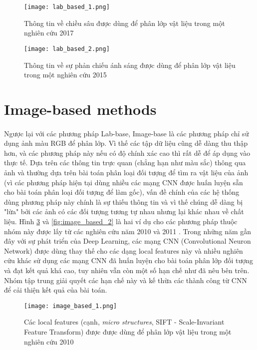 \begin{figure}[h!]
	\centering
	\captionsetup{width=0.9\textwidth}
	\texttt{[image: lab\_based\_1.png]}
	\caption{Thông tin về chiều sâu được dùng để phân lớp vật liệu trong một nghiên cứu 2017 \cite{tanaka2017material}}
    \label{fig:lab_based_1}
\end{figure}

\begin{figure}[h!]
	\centering
	\captionsetup{width=0.9\textwidth}
	\texttt{[image: lab\_based\_2.png]}
	\caption{Thông tin về sự phản chiếu ánh sáng được dùng để phân lớp vật liệu trong một nghiên cứu 2015 \cite{zhang2015reflectance}}
    \label{fig:lab_based_2}
\end{figure}

\pagebreak

\section{Image-based methods}
\paragraph*{}
Ngược lại với các phương pháp Lab-base, Image-base là các phương pháp chỉ sử dụng ảnh màu RGB để phân lớp. Vì thế các tập dữ liệu cũng dễ dàng thu thập hơn, và các phương pháp này nếu có độ chính xác cao thì rất dễ để áp dụng vào thực tế. Dựa trên các thông tin trực quan (chẳng hạn như màu sắc) thông qua ảnh và thường dựa trên bài toán phân loại đối tượng để tìm ra vật liệu của ảnh (vì các phương pháp hiện tại dùng nhiều các mạng CNN được huấn luyện sẵn cho bài toán phân loại đối tượng để làm gốc), vấn đề chính của các hệ thống dùng phương pháp này chính là sự thiếu thông tin và vì thế chúng dễ dàng bị "lừa" bởi các ảnh có các đối tượng tương tự nhau nhưng lại khác nhau về chất liệu.
Hình \ref{fig:image_based_1} và \ref{fig:image_based_2} là hai ví dụ cho các phương pháp thuộc nhóm này được lấy từ các nghiên cứu năm 2010 \cite{liu2010exploring} và 2011 \cite{hu2011toward}. Trong những năm gần đây với sự phát triển của Deep Learning, các mạng CNN (Convolutional Neuron Network) được dùng thay thế cho các dạng local features này và nhiều nghiên cứu khác sử dụng các mạng CNN đã huấn luyện cho bài toán phân lớp đối tượng và đạt kết quả khá cao, tuy nhiên vẫn còn một số hạn chế như đã nêu bên trên. Nhóm tập trung giải quyết các hạn chế này và kế thừa các thành công từ CNN để cải thiện kết quả của bài toán.

\begin{figure}[h!]
	\centering
	\captionsetup{width=0.9\textwidth}
	\texttt{[image: image\_based\_1.png]}
	\caption{Các local features (cạnh, \textit{micro structures}, SIFT - Scale-Invariant Feature Transform) được được dùng để phân lớp vật liệu trong một nghiên cứu 2010 \cite{liu2010exploring}}
    \label{fig:image_based_1}
\end{figure}

